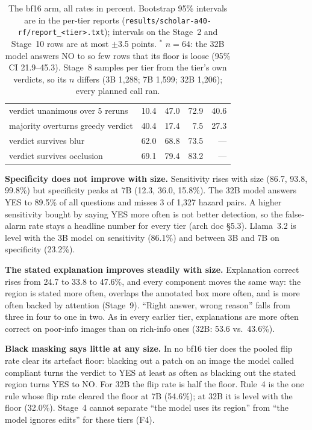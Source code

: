 \begin{table}[tbp]
\begin{tabular}{lrrrr}
verdict unanimous over 5 reruns     & 10.4 & 47.0 & 72.9 & 40.6 \\
majority overturns greedy verdict   & 40.4 & 17.4 & 7.5 & 27.3 \\
verdict survives blur               & 62.0 & 68.8 & 73.5 & --- \\
verdict survives occlusion          & 69.1 & 79.4 & 83.2 & --- \\
\bottomrule
\end{tabular}
\caption{The bf16 arm, all rates in percent. Bootstrap 95\% intervals are in the per-tier reports
(\texttt{results/scholar-a40-rf/report\_<tier>.txt}); intervals on the Stage~2 and Stage~10 rows are at
most $\pm$3.5 points. $^{*}$ $n=64$: the 32B model answers NO to so few rows that its floor is loose
(95\% CI 21.9--45.3). Stage~8 samples per tier from the tier's own verdicts, so its $n$ differs (3B 1,288;
7B 1,599; 32B 1,206); every planned call ran.}
\label{tab:s210}
\end{table}

\textbf{Specificity does not improve with size.} Sensitivity rises with size
(86.7, 93.8, 99.8\%) but specificity peaks at 7B (12.3, 36.0, 15.8\%). The 32B model answers YES to 89.5\%
of all questions and misses 3 of 1,327 hazard pairs. A higher sensitivity bought by saying YES more often is
not better detection, so the false-alarm rate stays a headline number for every tier (arch doc §5.3).
Llama~3.2 is level with the 3B model on sensitivity (86.1\%) and between 3B and 7B on specificity
(23.2\%).

\textbf{The stated explanation improves steadily with size.} Explanation correct rises from 24.7 to 33.8
to 47.6\%, and every component moves the same way: the region is stated more often, overlaps the annotated
box more often, and is more often backed by attention (Stage~9). ``Right answer, wrong reason'' falls from
three in four to one in two. As in every earlier tier, explanations are more often correct on poor-info
images than on rich-info ones (32B: 53.6 vs.\ 43.6\%).

\textbf{Black masking says little at any size.} In no bf16 tier does the pooled flip rate clear its
artefact floor: blacking out a patch on an image the model called compliant turns the verdict to YES at
least as often as blacking out the stated region turns YES to NO. For 32B the flip rate is half the floor.
Rule~4 is the one rule whose flip rate cleared the floor at 7B (54.6\%); at 32B it is level with the floor
(32.0\%). Stage~4 cannot separate ``the model uses its region'' from ``the model ignores edits'' for
these tiers (F4).

